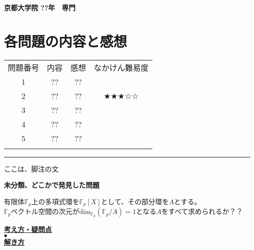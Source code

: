\documentclass[11pt]{article}
\begin{document}
\begin{center}
{\LARGE \textbf{京都大学院 	??年　専門}}
\end{center}
\vspace{2mm}

\section*{各問題の内容と感想}

\renewcommand{\arraystretch}{1.3} %
\begin{tabular}{!{\vrule width 1pt}c!{\vrule width 1pt}c!{\vrule width 1pt}c!{\vrule width 1pt}c!{\vrule width 1pt}}
\Xhline{1pt}
 問題番号 & 内容 & 感想 & なかけん難易度\\
\Xhline{1pt} %
1 & ?? & ?? & \\
\Xhline{1pt}
2 & ?? & ??&★★★☆☆\\
\Xhline{1pt}
3 & ?? & ?? & \\
\Xhline{1pt}
4 & ?? & ?? & \\
\Xhline{1pt}
5 & ?? & ?? & \\
\Xhline{1pt}
\end{tabular}

\vspace{1cm}


\vfill
\hrule
\vspace{1mm}
{\footnotesize ここは、脚注の文}


\newpage
\begin{center}
{\LARGE \textbf{未分類、どこかで発見した問題}}
\end{center}

\begin{tcolorbox}[mybox={東大専門 問？}]
有限体$\mathbb{F}_p$上の多項式環を$\mathbb{F}_p [X]$として、その部分環を$A$とする。\\
$\mathbb{F}_p$ベクトル空間の次元が$\text{dim}_{\mathbb{F}_p} (\mathbb{F}_p / A) =1$となる$A$をすべて求められるか？？
\end{tcolorbox}

\underline{\textbf{考え方・疑問点}}\\
$\bullet$ \\

\underline{\textbf{解き方}}\\
\end{document}
